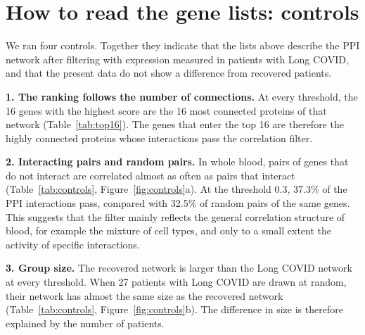 \documentclass[11pt,a4paper]{article}
\begin{document}
\begin{table}[H]
\centering
\caption{The 16 genes with the highest score at each threshold in the Long COVID group. Bold: core genes. Italic with an asterisk: genes that are not among the 16 genes of the main article. \emph{Published}: number of the 16 genes of the main article in the list. \emph{Most connected}: number of the 16 genes that are also the 16 most connected proteins of that network.}
\label{tab:top16}
\footnotesize
\setlength{\tabcolsep}{3.5pt}

\end{table}

\begin{table}[H]
\centering
\caption{Genes that enter the top 16 when the threshold increases. $K$ is the number of connections in the network with all measured interactions and in the network at the threshold 0.5. The known role is general background and is not a result of this analysis.}
\label{tab:new}
\footnotesize

\end{table}

\section{How to read the gene lists: controls}

We ran four controls. Together they indicate that the lists above describe the PPI network after filtering with expression measured in patients with Long COVID, and that the present data do not show a difference from recovered patients.

\textbf{1. The ranking follows the number of connections.} At every threshold, the 16 genes with the highest score are the 16 most connected proteins of that network (Table~\ref{tab:top16}). The genes that enter the top 16 are therefore the highly connected proteins whose interactions pass the correlation filter.

\textbf{2. Interacting pairs and random pairs.} In whole blood, pairs of genes that do not interact are correlated almost as often as pairs that interact (Table~\ref{tab:controls}, Figure~\ref{fig:controls}a). At the threshold 0.3, 37.3\% of the PPI interactions pass, compared with 32.5\% of random pairs of the same genes. This suggests that the filter mainly reflects the general correlation structure of blood, for example the mixture of cell types, and only to a small extent the activity of specific interactions.

\textbf{3. Group size.} The recovered network is larger than the Long COVID network at every threshold. When 27 patients with Long COVID are drawn at random, their network has almost the same size as the recovered network (Table~\ref{tab:controls}, Figure~\ref{fig:controls}b). The difference in size is therefore explained by the number of patients.
\end{document}
